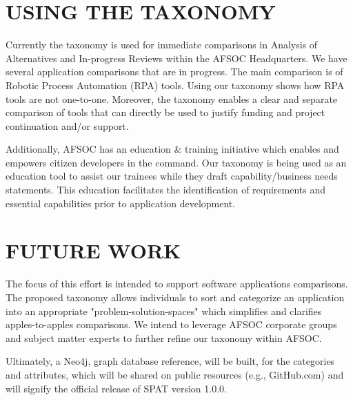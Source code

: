 \documentclass[letterpaper, 10 pt, conference]{ieeeconf}
\begin{document}
\section{USING THE TAXONOMY}
%
%
Currently the taxonomy is used for immediate comparisons in Analysis of Alternatives and In-progress Reviews within the AFSOC Headquarters.
We have several application comparisons that are in progress.
The main comparison is of Robotic Process Automation (RPA) tools.
Using our taxonomy shows how RPA tools are not one-to-one.
Moreover, the taxonomy enables a clear and separate comparison of tools that can directly be used to justify funding and project continuation and/or support.

Additionally, AFSOC has an education \& training initiative which enables and empowers citizen developers in the command.
Our taxonomy is being used as an education tool to assist our trainees while they draft capability/business needs statements.
This education facilitates the identification of requirements and essential capabilities prior to application development.

\section{FUTURE WORK}
%
%
The focus of this effort is intended to support software applications comparisons.
The proposed taxonomy allows individuals to sort and categorize an application into an appropriate "problem-solution-spaces" which simplifies and clarifies apples-to-apples comparisons.
We intend to leverage AFSOC corporate groups and subject matter experts to further refine our taxonomy within AFSOC.
 
Ultimately, a Neo4j, graph database reference, will be built, for the categories and attributes, which will be shared on public resources (e.g., GitHub.com) and will signify the official release of SPAT version 1.0.0.


\printbibliography

\end{document}
